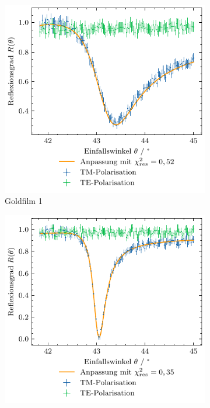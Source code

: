 \begin{figure}[H]
    \centering
    \begin{subfigure}{0.45\textwidth}
        \centering
        \includegraphics[width=\linewidth]{../figs/gold1_ppol_fit}
        \caption{Goldfilm 1}
    \end{subfigure}
    \begin{subfigure}{0.45\textwidth}
        \centering
        \includegraphics[width=\linewidth]{../figs/gold2_ppol_fit}

\end{subfigure}
\end{figure}
